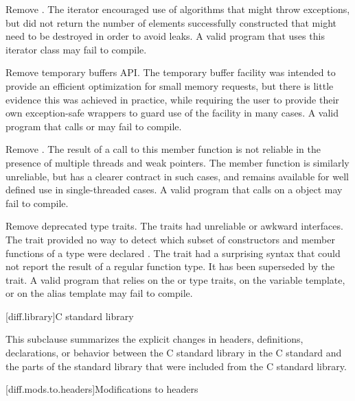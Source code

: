 \nodiffref
\change
Remove .
\rationale
The iterator encouraged use of algorithms that might throw exceptions, but did
not return the number of elements successfully constructed that might need to
be destroyed in order to avoid leaks.
\effect
A valid \CppXVII{} program that uses this iterator class may fail to compile.

\nodiffref
\change
Remove temporary buffers API.
\rationale
The temporary buffer facility was intended to provide an efficient optimization
for small memory requests, but there is little evidence this was achieved in
practice, while requiring the user to provide their own exception-safe wrappers
to guard use of the facility in many cases.
\effect
A valid \CppXVII{} program that calls  or
 may fail to compile.

\nodiffref
\change
Remove .
\rationale
The result of a call to this member function is not reliable in the presence of
multiple threads and weak pointers. The member function  is
similarly unreliable, but has a clearer contract in such cases, and remains
available for well defined use in single-threaded cases.
\effect
A valid \CppXVII{} program that calls  on a 
object may fail to compile.

\change
Remove deprecated type traits.
\rationale
The traits had unreliable or awkward interfaces. The 
trait provided no way to detect which subset of constructors and member
functions of a type were declared . The 
trait had a surprising syntax that could not report the result of a regular
function type. It has been superseded by the  trait.
\effect
A valid \CppXVII{} program that relies on the  or
 type traits, on the  variable template,
or on the  alias template may fail to compile.

[diff.library]{C standard library}
%

\pnum
This subclause summarizes the explicit changes in headers,
definitions, declarations, or behavior between the C standard library
in the C standard and the parts of the \Cpp{} standard library that were
included from the C standard library.

[diff.mods.to.headers]{Modifications to headers}

